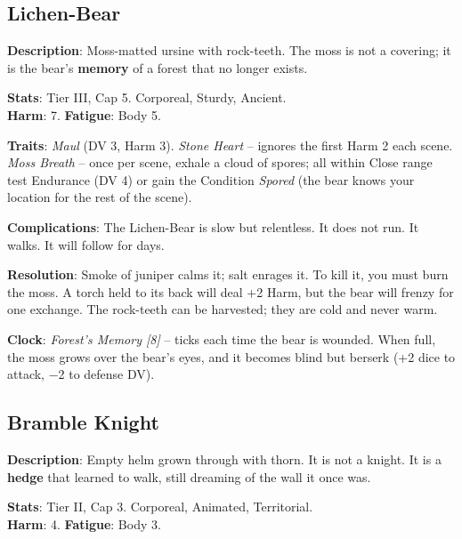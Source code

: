 
\subsection*{Lichen-Bear}

\noindent\textbf{Description}: Moss-matted ursine with rock-teeth. The moss is not a covering; it is the bear's \textbf{memory} of a forest that no longer exists.

\noindent\textbf{Stats}: Tier III, Cap 5. Corporeal, Sturdy, Ancient.\\
\textbf{Harm}: 7. \textbf{Fatigue}: Body 5.

\noindent\textbf{Traits}: 
\emph{Maul} (DV 3, Harm 3). \emph{Stone Heart} -- ignores the first Harm 2 each scene. \emph{Moss Breath} -- once per scene, exhale a cloud of spores; all within Close range test Endurance (DV 4) or gain the Condition \emph{Spored} (the bear knows your location for the rest of the scene).

\noindent\textbf{Complications}: The Lichen-Bear is slow but relentless. It does not run. It walks. It will follow for days.

\noindent\textbf{Resolution}: Smoke of juniper calms it; salt enrages it. To kill it, you must burn the moss. A torch held to its back will deal +2 Harm, but the bear will frenzy for one exchange. The rock-teeth can be harvested; they are cold and never warm.

\noindent\textbf{Clock}: \emph{Forest's Memory [8]} -- ticks each time the bear is wounded. When full, the moss grows over the bear's eyes, and it becomes blind but berserk (+2 dice to attack, −2 to defense DV).


\subsection*{Bramble Knight}

\noindent\textbf{Description}: Empty helm grown through with thorn. It is not a knight. It is a \textbf{hedge} that learned to walk, still dreaming of the wall it once was.

\noindent\textbf{Stats}: Tier II, Cap 3. Corporeal, Animated, Territorial.\\
\textbf{Harm}: 4. \textbf{Fatigue}: Body 3.

